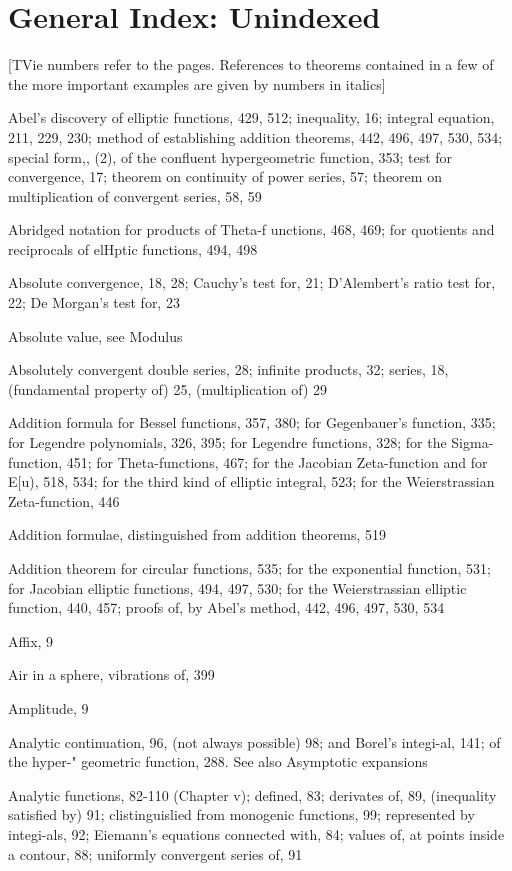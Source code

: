 \chapter{General Index: Unindexed}

[TVie numbers refer to the pages. References to theorems contained in a few of
the more important examples are given by numbers in italics]

Abel's discovery of elliptic functions, 429, 512; inequality, 16; integral equation, 211, 229, 230;
method of establishing addition theorems, 442, 496, 497, 530, 534; special form,, (2), of
the confluent hypergeometric function, 353; test for convergence, 17; theorem on continuity
of power series, 57; theorem on multiplication of convergent series, 58, 59

Abridged notation for products of Theta-f unctions, 468, 469; for quotients and reciprocals of
elHptic functions, 494, 498

Absolute convergence, 18, 28; Cauchy's test for, 21; D'Alembert's ratio test for, 22; De
 Morgan's test for, 23

Absolute value, see Modulus

Absolutely convergent double series, 28; infinite products, 32; series, 18, (fundamental
property of) 25, (multiplication of) 29

Addition formula for Bessel functions, 357, 380; for Gegenbauer's function, 335; for Legendre
polynomials, 326, 395; for Legendre functions, 328; for the Sigma-function, 451; for
Theta-functions, 467; for the Jacobian Zeta-function and for E[u), 518, 534; for the
third kind of elliptic integral, 523; for the Weierstrassian Zeta-function, 446

Addition formulae, distinguished from addition theorems, 519

Addition theorem for circular functions, 535; for the exponential function, 531; for Jacobian
elliptic functions, 494, 497, 530; for the Weierstrassian elliptic function, 440, 457; proofs
of, by Abel's method, 442, 496, 497, 530, 534

Affix, 9

Air in a sphere, vibrations of, 399

Amplitude, 9

Analytic continuation, 96, (not always possible) 98; and Borel's integi-al, 141; of the hyper-"
geometric function, 288. See also Asymptotic expansions

Analytic functions, 82-110 (Chapter v); defined, 83; derivates of, 89, (inequality satisfied by) 91;
clistinguislied from monogenic functions, 99; represented by integi-als, 92; Eiemann's
equations connected with, 84; values of, at points inside a contour, 88; uniformly convergent
series of, 91

